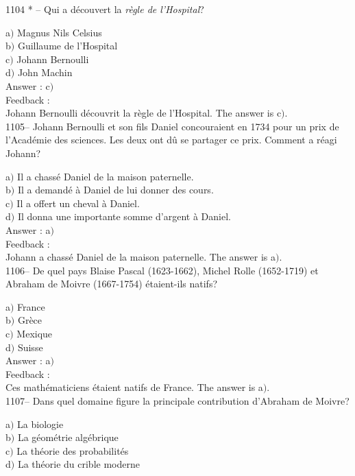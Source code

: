 \documentclass[letterpaper, 12pt]{article}
\begin{document}
1104 * -- Qui a d\'ecouvert la {\sl r\`egle de l'Hospital}?

a$)$ Magnus Nils Celsius \\
b$)$ Guillaume de l'Hospital \\
c$)$ Johann Bernoulli  \\
d$)$ John Machin  \\

Answer : c$)$\\

Feedback : \\
Johann Bernoulli d\'ecouvrit la r\`egle de l'Hospital.
The answer is c$)$.\\

1105-- Johann Bernoulli et son fils Daniel concouraient en 1734 pour
un prix de l'Acad\'emie des sciences. Les deux ont d\^u se partager
ce prix. Comment a r\'eagi Johann?

a$)$ Il a chass\'e Daniel de la maison paternelle.  \\
b$)$ Il a demand\'e \`a Daniel de lui donner des cours. \\
c$)$ Il a offert un cheval \`a Daniel.  \\
d$)$ Il donna une importante somme d'argent \`a Daniel.  \\

Answer : a$)$\\

Feedback : \\
Johann a chass\'e Daniel de la maison paternelle.
The answer is a$)$.\\

1106-- De quel pays Blaise Pascal (1623-1662), Michel Rolle
(1652-1719) et Abraham de Moivre (1667-1754) \'etaient-ils natifs?

a$)$ France  \\
b$)$ Gr\`ece \\
c$)$ Mexique  \\
d$)$ Suisse \\

Answer : a$)$\\

Feedback :\\
Ces math\'ematiciens \'etaient natifs de France.
The answer is a$)$.\\

1107-- Dans quel domaine figure la principale contribution d'Abraham
de Moivre?

a$)$ La biologie  \\
b$)$ La g\'eom\'etrie alg\'ebrique \\
c$)$ La th\'eorie des probabilit\'es  \\
d$)$ La th\'eorie du crible moderne\\
\end{document}
